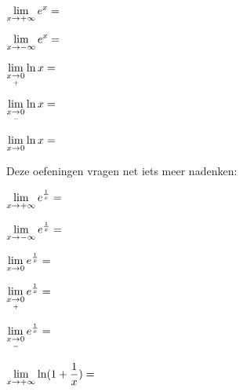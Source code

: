 \documentclass{ximera}
\begin{document}
\begin{exercise}
		\begin{question} \def\isA{correct}   $\limxi    e^x = \;$            \localoefoptions \end{question}
		\begin{question} \def\isB{correct}   $\limxmi   e^x = \;$            \localoefoptions \end{question}
		\begin{question} \def\isB{correct}   $\rlimx    \ln x = \;$          \localoefoptions \end{question}
			{\reversemarginpar\marginpar{\Smiley}}
		\begin{question} \def\isE{correct}   $\llimx    \ln x = \;$          \localoefoptions \end{question}
		\begin{question} \def\isE{correct}   $\limxz    \ln x = \;$          \localoefoptions \end{question}
		Deze oefeningen vragen net iets meer nadenken:				
		\begin{question} \def\isD{correct}   $\limxi    e^{\frac 1x} = \;$   \localoefoptions \end{question}
		\begin{question} \def\isC{correct}   $\limxmi   e^{\frac 1x} = \;$   \localoefoptions \end{question}
		\begin{question} \def\isE{correct}   $\limxz     e^{\frac 1x} = \;$   \localoefoptions \end{question}
		\begin{question} \def\isA{correct}   $\rlimx    e^{\frac 1x} = \;$   \localoefoptions \end{question}
		\begin{question} \def\isC{correct}   $\llimx    e^{\frac 1x} = \;$   \localoefoptions \end{question}
		\begin{question} \def\isC{correct}   $\limxi    \ln(1+ \frac 1x) = \;$ \localoefoptions \end{question}
		
\end{exercise}
\end{document}
